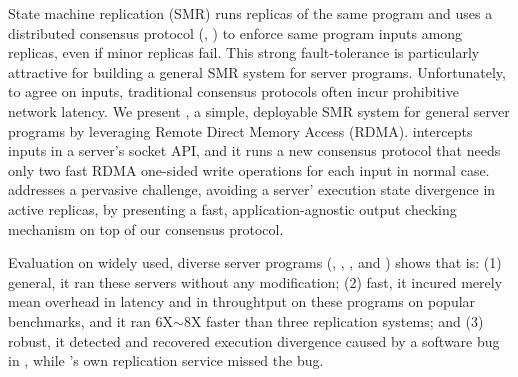 

State machine replication (SMR) runs replicas of the same program and 
uses a distributed consensus protocol (\eg, \paxos) to enforce same program 
inputs among replicas, even if minor replicas fail. This strong 
fault-tolerance is particularly attractive for building a general SMR system 
for server programs. Unfortunately, to agree on inputs, traditional consensus 
protocols often incur prohibitive network latency. We present \xxx, a simple, 
deployable SMR system for general server programs by leveraging Remote Direct 
Memory Access (RDMA). \xxx intercepts inputs in a server's socket API, and it 
runs a new \paxos consensus protocol that needs only two fast RDMA one-sided 
write operations for each input in normal case. \xxx addresses a pervasive 
challenge, avoiding a server' execution state divergence in active replicas, by 
presenting a fast, application-agnostic output checking mechanism on top of our 
consensus protocol.

Evaluation on \npopularprog widely used, diverse server programs (\eg, 
\memcached, \mysql, and \clamav) shows that \xxx is: (1) general, it ran these 
servers without any modification; (2) fast, it incured merely \latencyoverhead 
mean overhead in latency and \tputoverhead in throughtput on these programs on 
popular benchmarks, and it ran 6X$\sim$8X faster than three replication 
systems; and (3) robust, it detected and recovered execution divergence caused 
by a software bug in \redis, while \redis's own replication service missed the 
bug.


